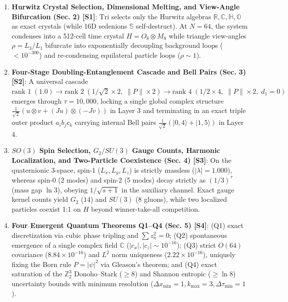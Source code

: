 \documentclass[
  a4paper,
]{article}
\providecommand{\tightlist}{%
  \setlength{\itemsep}{0pt}\setlength{\parskip}{0pt}}
\begin{document}
\begin{enumerate}
\def\labelenumi{\arabic{enumi}.}
\tightlist
\item
  \textbf{Hurwitz Crystal Selection, Dimensional Melting, and View-Angle
  Bifurcation (Sec. 2) {[}S1{]}}: \(\mathrm{Tri}\) selects only the
  Hurwitz algebras \(\mathbb{R}, \mathbb{C}, \mathbb{H}, \mathbb{O}\) as
  exact crystals (while 16D sedenions \(\mathbb{S}\) self-destruct). At
  \(N = 64\), the system condenses into a 512-cell time crystal
  \(H = O_8 \otimes M_8\) while triangle view-angles \(\rho = L_3/L_1\)
  bifurcate into exponentially decoupling background loops
  (\(< 10^{-300}\)) and re-condensing equilateral particle loops
  (\(\rho \sim 1\)).
\item
  \textbf{Four-Stage Doubling-Entanglement Cascade and Bell Pairs (Sec.
  3) {[}S2{]}}: A universal cascade
  \(\text{rank } 1\;(1.0) \to \text{rank } 2\;(1/\sqrt{2}\times 2,\; \|P\|\times 2) \to \text{rank } 4\;(1/2\times 4,\; \|P\|\times 2,\; d_1=0)\)
  emerges through \(\tau = 10{,}000\), locking a single global complex
  structure \(\frac{1}{\sqrt{2}}(u\otimes v + (Ju)\otimes(-Jv))\) in
  Layer 3 and terminating in an exact triple outer product
  \(a_i b_j c_k\) carrying internal Bell pairs
  \(\frac{1}{\sqrt{2}}(|0,4\rangle + |1,5\rangle)\) in Layer 4.
\item
  \textbf{\(SO(3)\) Spin Selection, \(G_2/SU(3)\) Gauge Counts, Harmonic
  Localization, and Two-Particle Coexistence (Sec. 4) {[}S3{]}}: On the
  quaternionic 3-space, spin-1 (\(L_x, L_y, L_z\)) is strictly massless
  (\(|\lambda|=1.000\)), whereas spin-0 (2 modes) and spin-2 (5 modes)
  decay strictly as \((1/3)^\tau\) (mass gap \(\ln 3\)), obeying
  \(1/\sqrt{s+1}\) in the auxiliary channel. Exact gauge kernel counts
  yield \(G_2\) (\(14\)) and \(SU(3)\) (\(8\) gluons), while two
  localized particles coexist 1:1 on \(H\) beyond winner-take-all
  competition.
\item
  \textbf{Four Emergent Quantum Theorems Q1--Q4 (Sec. 5) {[}S4{]}}: (Q1)
  exact discretization via cubic phase tripling and \(\sum z_n^2 = 0\);
  (Q2) spontaneous emergence of a single complex field \(\mathbb{C}\)
  (\(|c_x|,|c_z| \sim 10^{-16}\)); (Q3) strict \(O(64)\) covariance
  (\(8.84\times 10^{-16}\)) and \(L^2\) norm uniqueness
  (\(2.22\times 10^{-16}\)), uniquely fixing the Born rule
  \(P = |\psi|^2\) via Gleason's theorem; and (Q4) exact saturation of
  the \(\mathbb{Z}_2^3\) Donoho--Stark (\(\ge 8\)) and Shannon entropic
  (\(\ge \ln 8\)) uncertainty bounds with minimum resolution
  (\(\Delta x_{\min}=1, k_{\max}=3, \Delta\tau_{\min}=1\)).

\end{enumerate}
\end{document}
